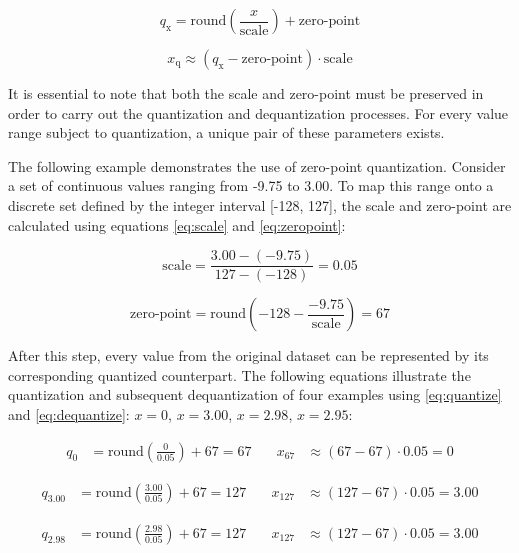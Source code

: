 {\begin{equation}
q_{\text{x}} = \text{round}\left(\frac{x}{\text{scale}} \right) + \text{zero-point}
\label{eq:quantize}
\end{equation}

\begin{equation}
x_{\text{q}} \approx \left( q_{\text{x}} - \text{zero-point} \right) \cdot \text{scale}
\label{eq:dequantize}
\end{equation}

It is essential to note that both the scale and zero-point must be preserved in order to carry out the quantization and dequantization processes.
For every value range subject to quantization, a unique pair of these parameters exists.

The following example demonstrates the use of zero-point quantization. Consider a set of continuous values ranging from -9.75 to 3.00.
To map this range onto a discrete set defined by the integer interval [-128, 127], the scale and zero-point are calculated using equations \ref{eq:scale} and \ref{eq:zeropoint}:

\begin{equation*}
\text{scale} = \frac{3.00 - (-9.75)}{127 - (-128)} = 0.05
\end{equation*}

\begin{equation*}
\text{zero-point} = \text{round}\left( -128 - \frac{-9.75}{\text{scale}} \right) = 67
\end{equation*}


After this step, every value from the original dataset can be represented by its corresponding quantized counterpart.
The following equations illustrate the quantization and subsequent dequantization of four examples using \ref{eq:quantize} and \ref{eq:dequantize}:
\( x = 0 \), \( x = 3.00 \), \( x = 2.98 \), \( x = 2.95 \):

\begin{align*}
q_{0} &= \text{round}\left(\frac{0}{0.05} \right) + 67 = 67
& \quad
x_{67} &\approx \left( 67 - 67 \right) \cdot 0.05 = 0
\end{align*}

\begin{align*}
q_{3.00} &= \text{round}\left(\frac{3.00}{0.05} \right) + 67 = 127
& \quad
x_{127} &\approx \left( 127 - 67 \right) \cdot 0.05 = 3.00
\end{align*}

\begin{align*}
q_{2.98} &= \text{round}\left(\frac{2.98}{0.05} \right) + 67 = 127
& \quad
x_{127} &\approx \left( 127 - 67 \right) \cdot 0.05 = 3.00
\end{align*}

}
